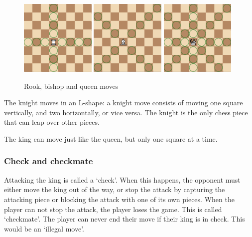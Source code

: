 \documentclass{article}
\begin{document}
\begin{figure}[H]
    \centering
    \includegraphics[width=0.32\textwidth]{img/rook.png}
    \includegraphics[width=0.32\textwidth]{img/bishop.png}
    \includegraphics[width=0.32\textwidth]{img/queen.png}
    \caption{Rook, bishop and queen moves}
\end{figure}


The knight moves in an L-shape: a knight move consists of moving one square vertically, and two horizontally, or vice versa.
The knight is the only chess piece that can leap over other pieces.

The king can move just like the queen, but only one square at a time.


\subsubsection{Check and checkmate}

Attacking the king is called a `check'. When this happens, the opponent must either move the king out of the way, or
stop the attack by capturing the attacking piece or blocking the attack with one of its own pieces. 
When the player can not stop the attack, the player loses the game. This is called `checkmate'.
The player can never end their move if their king is in check. This would be an `illegal move'.
\end{document}
